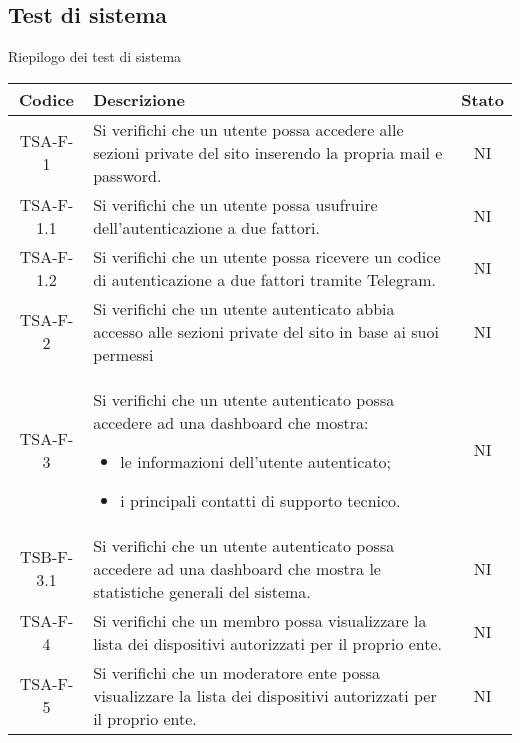 	\subsection{Test di sistema}
		\begin{center}
		Riepilogo dei test di sistema
			\begin{longtable}{|c|p{10cm}|c|}
			\hline
			\rowcolor{lighter-grayer}
			\textbf{Codice} & \textbf{Descrizione} & \textbf{Stato}  \\ %

			\hline
			\endhead

	
			\hline
			 TSA-F-1 & Si verifichi che un utente possa accedere alle sezioni private del sito inserendo la propria mail e password.
			  & NI \\
			 \hline
			 TSA-F-1.1 & Si verifichi che un utente possa usufruire dell'autenticazione a due fattori. & NI \\
			 \hline
			 TSA-F-1.2 & Si verifichi che un utente possa ricevere un codice di autenticazione a due fattori tramite Telegram. & NI \\
			 \hline
			 TSA-F-2 & Si verifichi che un utente autenticato abbia accesso alle sezioni private del sito in base ai suoi permessi & NI \\
			 \hline
			 TSA-F-3 & Si verifichi che un utente autenticato possa accedere ad una dashboard che mostra:
			 \begin{itemize}
			 	\item le informazioni dell'utente autenticato;
			 	\item i principali contatti di supporto tecnico.
			 \end{itemize} & NI \\
			 \hline
			 TSB-F-3.1 & Si verifichi che un utente autenticato possa accedere ad una dashboard che mostra le statistiche generali del sistema. & NI \\
			 \hline
			 TSA-F-4 & Si verifichi che un membro possa visualizzare la lista dei dispositivi autorizzati per il proprio ente. & NI \\
			 \hline
			 TSA-F-5 & Si verifichi che un moderatore ente possa visualizzare la lista dei dispositivi autorizzati per il proprio ente. & NI \\

\end{longtable}
\end{center}
